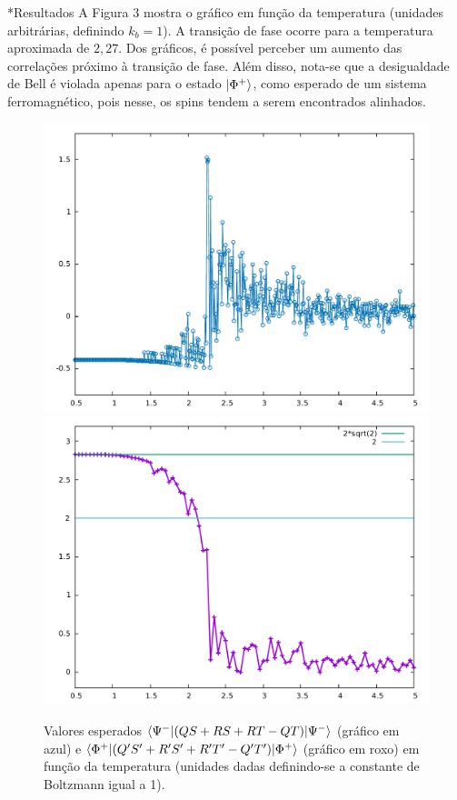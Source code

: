 \documentclass[plainsections, 32pt]{sciposter}
\makeatletter
\newcommand{\largo}{\fontsize{36}{40}\selectfont }
\renewcommand\section{\@startsection {section}{1}{\z@}{-1ex \@plus -0.5ex \@minus -.1ex}{0.8ex \@plus.1ex}{\largo\bfseries\fontsize{28}{26}\selectfont}}
\makeatother
\begin{document}
\begin{multicols}{2}
\section*{Resultados}
A Figura 3 mostra o gráfico em função da temperatura (unidades arbitrárias, definindo $k_b = 1$). A transição de fase ocorre para a temperatura aproximada de $2,27$. Dos gráficos, é possível perceber um aumento das correlações próximo à transição de fase. Além disso, nota-se que a desigualdade de Bell é violada apenas para o estado $\ket{\Phi^+}$, como esperado de um sistema ferromagnético, pois nesse, os spins tendem a serem encontrados alinhados.
\vspace{2mm}
\begin{figure}
  \center
  \includegraphics[scale = .7]{result3.pdf}
  \includegraphics[scale = .7]{bell.pdf}
  \caption{Valores esperados $\braket{\Psi^-|(QS + RS + RT - QT)|\Psi^-} $ (gráfico em azul) e $ \braket{\Phi^+|(Q^\prime S^\prime + R^\prime S^\prime + R^\prime T^\prime - Q^\prime T^\prime)|\Phi^+}$ (gráfico em roxo) em função da temperatura (unidades dadas definindo-se a constante de Boltzmann igual a 1).}
\end{figure}



\end{multicols}
\end{document}
